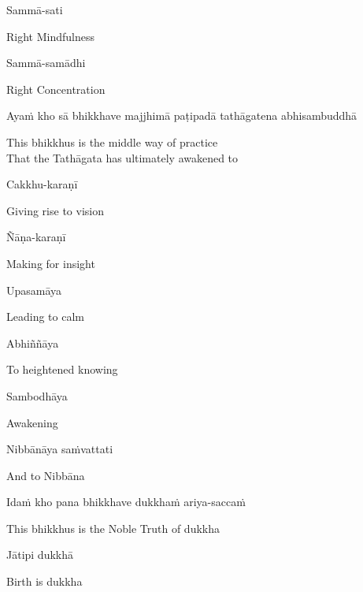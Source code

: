 Sammā-sati

\begin{english}
  Right Mindfulness
\end{english}

Sammā-samādhi

\begin{english}
  Right Concentration
\end{english}

Ayaṁ kho sā bhikkhave majjhimā paṭipadā tathāgatena abhisambuddhā

\begin{english}
  This bhikkhus is the middle way of practice\\
  That the Tathāgata has ultimately awakened to
\end{english}

Cakkhu-karaṇī

\begin{english}
  Giving rise to vision
\end{english}

Ñāṇa-karaṇī

\begin{english}
  Making for insight
\end{english}

Upasamāya

\begin{english}
  Leading to calm
\end{english}

Abhiññāya

\begin{english}
  To heightened knowing
\end{english}

Sambodhāya

\begin{english}
  Awakening
\end{english}

Nibbānāya saṁvattati

\begin{english}
  And to Nibbāna
\end{english}

Idaṁ kho pana bhikkhave dukkhaṁ ariya-saccaṁ

\begin{english}
  This bhikkhus is the Noble Truth of dukkha
\end{english}

Jātipi dukkhā

\begin{english}
  Birth is dukkha
\end{english}

